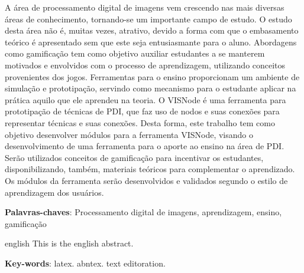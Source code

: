 \documentclass[
	12pt,				%
	oneside,			%
	a4paper,			%
	english,			%
	french,				%
	spanish,			%
	brazil,				%
	]{abntex2}
\begin{document}
\frenchspacing 


\imprimircapa
\imprimirfolhaderosto






\begin{resumo}
A área de processamento digital de imagens vem crescendo nas mais diversas áreas de conhecimento, tornando-se um importante campo de estudo. O estudo desta área não é, muitas vezes, atrativo, devido a forma com que o embasamento teórico é apresentado sem que este seja entusiasmante para o aluno. Abordagens como gamificação tem como objetivo auxiliar estudantes a se manterem motivados e envolvidos com o processo de aprendizagem, utilizando conceitos provenientes dos jogos. Ferramentas para o ensino proporcionam um ambiente de simulação e prototipação, servindo como mecanismo para o estudante aplicar na prática aquilo que ele aprendeu na teoria. O VISNode é uma ferramenta para prototipação de técnicas de PDI, que faz uso de nodos e suas conexões para representar técnicas e suas conexões. Desta forma, este trabalho tem como objetivo desenvolver módulos para a ferramenta VISNode, visando o desenvolvimento de uma ferramenta para o aporte ao ensino na área de PDI. Serão utilizados conceitos de gamificação para incentivar os estudantes, disponibilizando, também, materiais teóricos para complementar o aprendizado. Os módulos da ferramenta serão desenvolvidos e validados segundo o estilo de aprendizagem dos usuários.

 \vspace{\onelineskip}
    
 \noindent
 \textbf{Palavras-chaves}: Processamento digital de imagens, aprendizagem, ensino, gamificação
\end{resumo}

\begin{resumo}[Abstract]
 \begin{otherlanguage*}{english}
   This is the english abstract.

   \vspace{\onelineskip}
 
   \noindent 
   \textbf{Key-words}: latex. abntex. text editoration.
 \end{otherlanguage*}
\end{resumo}
\end{document}

